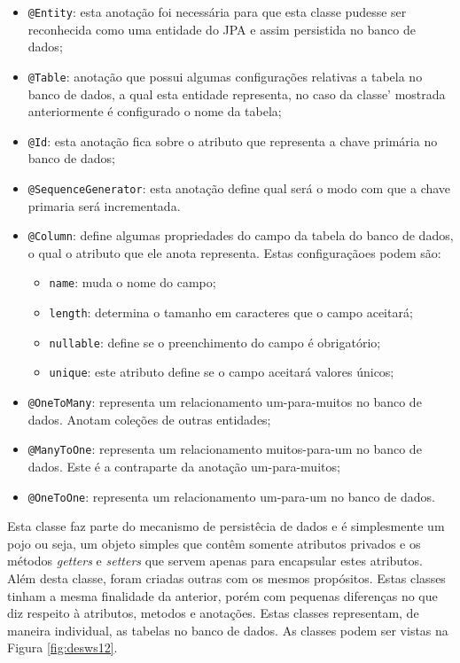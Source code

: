 	\begin{itemize}
	  \item \texttt{@Entity}: esta anotação foi necessária para que esta classe
	  pudesse ser reconhecida como uma entidade do JPA e assim persistida no banco
	  de dados;
	  \item \texttt{@Table}: anotação que possui algumas configurações relativas a
	  tabela no banco de dados, a qual esta entidade representa, no caso da classe'
	  mostrada anteriormente é configurado o nome da tabela;
	  \item \texttt{@Id}: esta anotação fica sobre o atributo que representa a
	  chave primária no banco de dados;
	  \item \texttt{@SequenceGenerator}: esta anotação define qual será o modo com
	  que a chave primaria será incrementada.
	  \item \texttt{@Column}: define algumas propriedades do campo da tabela do
	  banco de dados, o qual o atributo que ele anota representa. Estas
	  configuraçãoes podem são:
		  	\begin{itemize}
		    	\item \texttt{name}: muda o nome do campo;
		    	\item \texttt{length}: determina o tamanho em caracteres que o campo
		    	aceitará;
		    	\item \texttt{nullable}: define se o preenchimento do campo é obrigatório;
		    	\item \texttt{unique}: este atributo define se o campo aceitará valores
		    	únicos;
		    \end{itemize}
	  \item \texttt{@OneToMany}: representa um relacionamento um-para-muitos no
	  banco de dados. Anotam coleções de outras entidades;
	  \item \texttt{@ManyToOne}: representa um relacionamento
	  muitos-para-um no banco de dados. Este é a contraparte da anotação
	  um-para-muitos;
	  \item \texttt{@OneToOne}: representa um relacionamento um-para-um no banco de
	  dados.
\end{itemize}
 
	\par Esta classe faz parte do mecanismo de persistêcia de dados e é
simplesmente um  pojo ou seja, um objeto  simples que contêm somente atributos
privados e os métodos \textit{getters} e \textit{setters} que servem apenas
para encapsular estes atributos. Além desta classe, foram criadas outras com os
mesmos propósitos. Estas classes tinham a mesma finalidade da anterior, porém
com pequenas diferenças no que diz respeito à atributos, metodos e anotações.
Estas classes representam, de maneira individual, as tabelas no banco de dados.
As classes podem ser vistas na Figura \ref{fig:desws12}.
	
